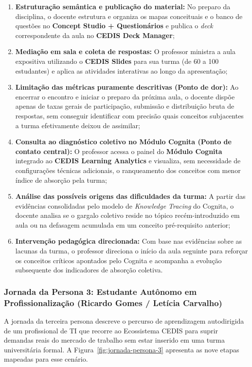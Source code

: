 \begin{enumerate}
    \item \textbf{Estruturação semântica e publicação do material:} No preparo da disciplina, o docente estrutura e organiza os mapas conceituais e o banco de questões no \textbf{Concept Studio + Questionários} e publica o \textit{deck} correspondente da aula no \textbf{CEDIS Deck Manager};
    \item \textbf{Mediação em sala e coleta de respostas:} O professor ministra a aula expositiva utilizando o \textbf{CEDIS Slides} para sua turma (de 60 a 100 estudantes) e aplica as atividades interativas ao longo da apresentação;
    \item \textbf{Limitação das métricas puramente descritivas (Ponto de dor):} Ao encerrar o encontro e iniciar o preparo da próxima aula, o docente dispõe apenas de taxas gerais de participação, submissão e distribuição bruta de respostas, sem conseguir identificar com precisão quais conceitos subjacentes a turma efetivamente deixou de assimilar;
    \item \textbf{Consulta ao diagnóstico coletivo no Módulo Cognita (Ponto de contato central):} O professor acessa o painel do \textbf{Módulo Cognita} integrado ao \textbf{CEDIS Learning Analytics} e visualiza, sem necessidade de configurações técnicas adicionais, o ranqueamento dos conceitos com menor índice de absorção pela turma;
    \item \textbf{Análise das possíveis origens das dificuldades da turma:} A partir das evidências consolidadas pelo modelo de \textit{Knowledge Tracing} do Cognita, o docente analisa se o gargalo coletivo reside no tópico recém-introduzido em aula ou na defasagem acumulada em um conceito pré-requisito anterior;
    \item \textbf{Intervenção pedagógica direcionada:} Com base nas evidências sobre as lacunas da turma, o professor direciona o início da aula seguinte para reforçar os conceitos críticos apontados pelo Cognita e acompanha a evolução subsequente dos indicadores de absorção coletiva.
\end{enumerate}

\subsubsection{Jornada da Persona 3: Estudante Autônomo em Profissionalização (Ricardo Gomes / Letícia Carvalho)}
\label{subsubsec:jornada-persona-3}

A jornada da terceira persona descreve o percurso de aprendizagem autodirigida de um profissional de TI que recorre ao Ecossistema CEDIS para suprir demandas reais do mercado de trabalho sem estar inserido em uma turma universitária formal. A Figura~\ref{fig:jornada-persona-3} apresenta as nove etapas mapeadas para esse cenário.

